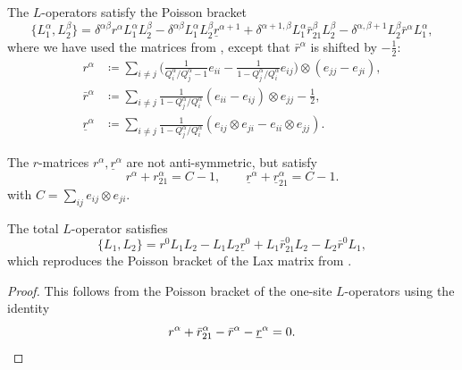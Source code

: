 \begin{prop}
The $L$-operators satisfy the Poisson bracket
\begin{equation}\label{eq:Lops}
    \{ L_1^\alpha, L_2^\beta \} = \delta^{\alpha\beta} r^\alpha L_1^\alpha L_2^\beta - \delta^{\alpha\beta} L_1^\alpha L_2^\beta \underline r^{\alpha+1} + \delta^{\alpha+1,\beta} L_1^\alpha \bar r_{21}^\beta L_2^\beta - \delta^{\alpha,\beta+1} L_2^\beta \bar r^\alpha L_1^\alpha,
\end{equation}
where we have used the matrices from \cite{arutyunov_quantum_2019}, except that $\bar r^\alpha$ is shifted by $-\tfrac{1}{2}$:
\begin{align}\label{eq:hypMat}
    r^\alpha &\coloneq \sum_{i \neq j} \Big( \frac{1}{Q_i^\alpha/Q_j^\alpha-1} e_{ii} - \frac{1}{1-Q_j^\alpha/Q_i^\alpha} e_{ij} \Big) \otimes (e_{jj} - e_{ji}),
    \\
    \bar r^\alpha &\coloneq \sum_{i \neq j} \frac{1}{1-Q_j^\alpha/Q_i^\alpha} (e_{ii}-e_{ij}) \otimes e_{jj} - \frac{1}{2},
    \\[4pt]
    \underline r^\alpha &\coloneq \sum_{i \neq j} \frac{1}{1-Q_j^\alpha/Q_i^\alpha} (e_{ij} \otimes e_{ji} - e_{ii} \otimes e_{jj}).
\end{align}
\end{prop}

\begin{remark}
    The $r$-matrices $r^\alpha,\underline r^\alpha$ are not anti-symmetric, but satisfy
    \begin{equation}
        r^\alpha + r_{21}^\alpha = C - 1, \qquad \underline r^\alpha + \underline r_{21}^\alpha = C - 1.
    \end{equation}
    with $C = \sum_{ij} e_{ij} \otimes e_{ji}$.
\end{remark}

\begin{corollary}
    The total $L$-operator satisfies
    \begin{equation}
        \{ L_1, L_2 \} = r^0 L_1 L_2 - L_1 L_2 \underline r^0 + L_1 \bar r_{21}^0 L_2 - L_2 \bar r^0 L_1,
    \end{equation}
    which reproduces the Poisson bracket of the Lax matrix from \cite{arutyunov_quantum_2019}.
\end{corollary}

\begin{proof}
    This follows from the Poisson bracket of the one-site $L$-operators using the identity
    \begin{equation*}
        r^\alpha + \bar r_{21}^\alpha - \bar r^\alpha - \underline r^\alpha = 0.
        \vspace{-1.5\baselineskip}
    \end{equation*}
\end{proof}

